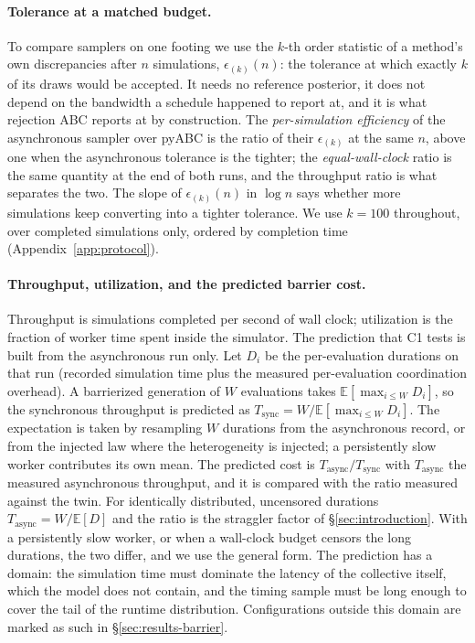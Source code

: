 \documentclass[10pt]{article}
\theoremstyle{plain}
\theoremstyle{definition}
\begin{document}
\paragraph{Tolerance at a matched budget.} To compare samplers on one footing we use the $k$-th order statistic of a method's own discrepancies after $n$ simulations, $\epsilon_{(k)}(n)$: the tolerance at which exactly $k$ of its draws would be accepted. It needs no reference posterior, it does not depend on the bandwidth a schedule happened to report at, and it is what rejection ABC reports at by construction. The \emph{per-simulation efficiency} of the asynchronous sampler over pyABC is the ratio of their $\epsilon_{(k)}$ at the same $n$, above one when the asynchronous tolerance is the tighter; the \emph{equal-wall-clock} ratio is the same quantity at the end of both runs, and the throughput ratio is what separates the two. The slope of $\epsilon_{(k)}(n)$ in $\log n$ says whether more simulations keep converting into a tighter tolerance. We use $k=100$ throughout, over completed simulations only, ordered by completion time (Appendix~\ref{app:protocol}).

\paragraph{Throughput, utilization, and the predicted barrier cost.} Throughput is simulations completed per second of wall clock; utilization is the fraction of worker time spent inside the simulator. The prediction that C1 tests is built from the asynchronous run only. Let $D_i$ be the per-evaluation durations on that run (recorded simulation time plus the measured per-evaluation coordination overhead). A barrierized generation of $W$ evaluations takes $\mathbb{E}[\max_{i\le W} D_i]$, so the synchronous throughput is predicted as $T_{\mathrm{sync}}=W/\mathbb{E}[\max_{i\le W}D_i]$. The expectation is taken by resampling $W$ durations from the asynchronous record, or from the injected law where the heterogeneity is injected; a persistently slow worker contributes its own mean. The predicted cost is $T_{\mathrm{async}}/T_{\mathrm{sync}}$ with $T_{\mathrm{async}}$ the measured asynchronous throughput, and it is compared with the ratio measured against the twin. For identically distributed, uncensored durations $T_{\mathrm{async}}=W/\mathbb{E}[D]$ and the ratio is the straggler factor of \S\ref{sec:introduction}. With a persistently slow worker, or when a wall-clock budget censors the long durations, the two differ, and we use the general form. The prediction has a domain: the simulation time must dominate the latency of the collective itself, which the model does not contain, and the timing sample must be long enough to cover the tail of the runtime distribution. Configurations outside this domain are marked as such in \S\ref{sec:results-barrier}.
\end{document}
